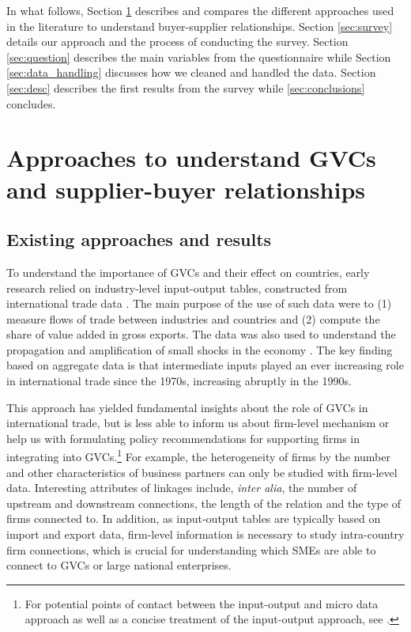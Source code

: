 \documentclass[final, dvipsnames, authoryear,12pt]{elsarticle}
\begin{document}
In what follows, Section \ref{sec: approach} describes and compares the different approaches used in the literature to understand buyer-supplier relationships. Section \ref{sec:survey} details our approach and the process of conducting the survey. Section \ref{sec:question} describes the main variables from the questionnaire while Section \ref{sec:data_handling} discusses how we cleaned and handled the data. Section \ref{sec:desc} describes the first results from the survey while \ref{sec:conclusions} concludes.  

\section{Approaches to understand GVCs and supplier-buyer relationships} 
\label{sec: approach}

\subsection{Existing approaches and results}

To understand the importance of GVCs and their effect on countries, early research relied on industry-level input-output tables, constructed from international trade data \citep{johnson2012accounting, hummels2001nature}. The main purpose of the use of such data were to (1) measure flows of trade between industries and countries and (2) compute the share of value added in gross exports. The data was also used to understand the propagation and amplification of small shocks in the economy \citep{acemoglu2016networks}. The key finding based on aggregate data is that intermediate inputs played an ever increasing role in international trade since the 1970s, increasing abruptly in the 1990s. 

This approach has yielded fundamental insights about the role of GVCs in international trade, but is less able to inform us about firm-level mechanism or help us with formulating policy recommendations for supporting firms in integrating into GVCs.\footnote{For potential points of contact between the input-output and micro data approach as well as a concise treatment of the input-output approach, see \cite{johnson2018measuring}.} For example, the heterogeneity of firms by the number and other characteristics of business partners can only be studied with firm-level data. Interesting attributes of linkages include, \textit{inter alia}, the number of upstream and downstream connections, the length of the relation and the type of firms connected to. In addition, as input-output tables are typically based on import and export data, firm-level information is necessary to study intra-country firm connections, which is crucial for understanding which SMEs are able to connect to GVCs or large national enterprises.
\end{document}
